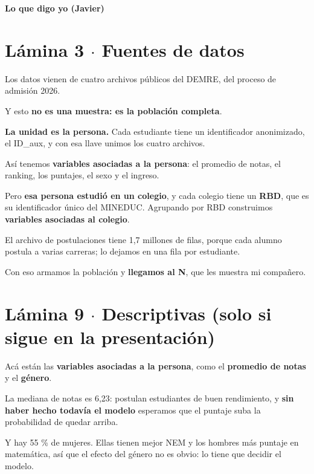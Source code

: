 \documentclass[11pt]{article}
\begin{document}
\pagecolor{black}\color{white}
{\LARGE\bfseries Lo que digo yo (Javier)\par}\medskip

\section*{Lámina 3 $\cdot$ Fuentes de datos}

\begin{guion}Los datos vienen de cuatro archivos públicos del DEMRE, del proceso de admisión 2026.\par Y esto \textbf{no es una muestra: es la población completa}.\par \textbf{La unidad es la persona.} Cada estudiante tiene un identificador anonimizado, el ID\_aux, y con esa llave unimos los cuatro archivos.\par Así tenemos \textbf{variables asociadas a la persona}: el promedio de notas, el ranking, los puntajes, el sexo y el ingreso.\par Pero \textbf{esa persona estudió en un colegio}, y cada colegio tiene un \textbf{RBD}, que es su identificador único del MINEDUC. Agrupando por RBD construimos \textbf{variables asociadas al colegio}.\par El archivo de postulaciones tiene 1,7 millones de filas, porque cada alumno postula a varias carreras; lo dejamos en una fila por estudiante.\par Con eso armamos la población y \textbf{llegamos al N}, que les muestra mi compañero.\end{guion}

\section*{Lámina 9 $\cdot$ Descriptivas (solo si sigue en la presentación)}

\begin{guion}Acá están las \textbf{variables asociadas a la persona}, como el \textbf{promedio de notas} y el \textbf{género}.\par La mediana de notas es 6,23: postulan estudiantes de buen rendimiento, y \textbf{sin haber hecho todavía el modelo} esperamos que el puntaje suba la probabilidad de quedar arriba.\par Y hay 55 \% de mujeres. Ellas tienen mejor NEM y los hombres más puntaje en matemática, así que el efecto del género no es obvio: lo tiene que decidir el modelo.\end{guion}
\end{document}
